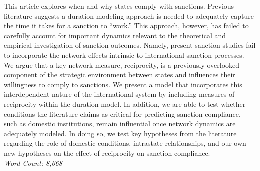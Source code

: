 This article explores when and why states comply with sanctions. Previous literature suggests a duration modeling approach is needed to adequately capture the time it takes for a sanction to ``work.'' This approach, however, has failed to carefully account for important dynamics relevant to the theoretical and empirical investigation of sanction outcomes. Namely, present sanction studies fail to incorporate the network effects intrinsic to international sanction processes. We argue that a key network measure, reciprocity, is a previously overlooked component of the strategic environment between states and influences their willingness to comply to sanctions. We present a model that incorporates this interdependent nature of the international system by including measures of reciprocity within the duration model. In addition, we are able to test whether conditions the literature claims as critical for predicting sanction compliance, such as domestic institutions, remain influential once network dynamics are adequately modeled. In doing so, we test key hypotheses from the literature regarding the role of domestic conditions, intrastate relationships, and our own new hypotheses on the effect of reciprocity on sanction compliance. \\

\noindent \textit{Word Count: 8,668}
